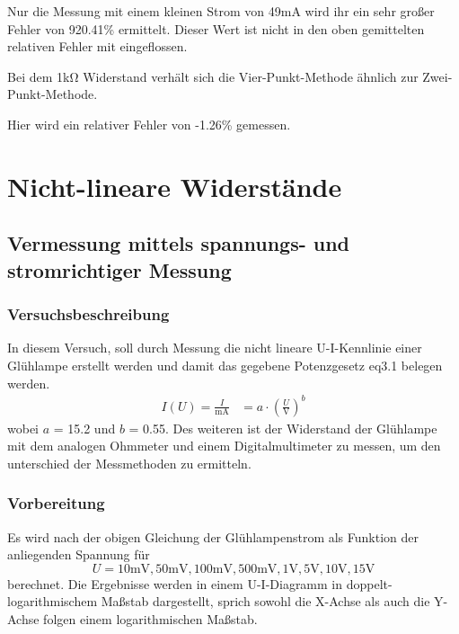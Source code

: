\documentclass[a4paper, 11pt]{report}
\DeclareRobustCommand{\eqref}[1]{\eqrefaux#1\eqrefaux}
\def\eqrefaux eq#1\eqrefaux{\textup{(#1)}}
\begin{document}
Nur die Messung mit einem kleinen Strom von 49\si{\milli\ampere} wird ihr ein sehr großer Fehler von 920.41\% ermittelt. Dieser Wert ist nicht in den oben gemittelten relativen Fehler mit eingeflossen.

Bei dem 1\si{\kilo\ohm} Widerstand verhält sich die Vier-Punkt-Methode ähnlich zur Zwei-Punkt-Methode.

Hier wird ein relativer Fehler von -1.26\% gemessen.

\chapter[Nicht-lineare Widerstände]{Nicht-lineare Widerstände}

\section[Experimentelle Vermessung]{Vermessung mittels spannungs- und stromrichtiger Messung}
\label{experimental-measurements}

\subsection{Versuchsbeschreibung}
In diesem Versuch, soll durch Messung die nicht lineare U-I-Kennlinie einer Glühlampe erstellt werden und damit das gegebene Potenzgesetz \eqref{eq3.1} belegen werden.
\begin{align}
I(U) = \frac{I}{\si{\milli\ampere}} &= a \cdot \left( \frac{U}{\si{\volt}} \right)^b
\label{eq:i-u-power-function}
\end{align}
wobei \(a\) = 15.2 und \(b\) = 0.55.
Des weiteren ist der Widerstand der Glühlampe mit dem analogen Ohmmeter und einem Digitalmultimeter zu messen, um den unterschied der Messmethoden zu ermitteln.

\subsection{Vorbereitung}
Es wird nach der obigen Gleichung der Glühlampenstrom als Funktion der anliegenden Spannung für
\[
U = 10\si{\milli\volt}, 50\si{\milli\volt}, 100\si{\milli\volt}, 500\si{\milli\volt}, 1\si{\volt}, 5\si{\volt}, 10\si{\volt}, 15\si{\volt}
\]
berechnet. Die Ergebnisse werden in einem U-I-Diagramm in doppelt-logarithmischem Maßstab dargestellt, sprich sowohl die X-Achse als auch die Y-Achse folgen einem logarithmischen Maßstab.
\end{document}
